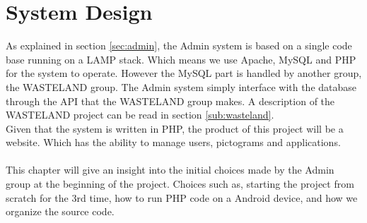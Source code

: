\chapter{System Design}
\label{chap:systemDesign}
As explained in section \vref{sec:admin}, the Admin system is based on a single code base running on a LAMP stack. Which means we use Apache, MySQL and PHP for the system to operate. However the MySQL part is handled by another group, the WASTELAND group. The Admin system simply interface with the database through the API that the WASTELAND group makes. A description of the WASTELAND project can be read in section \vref{sub:wasteland}.\\
Given that the system is written in PHP, the product of this project will be a website. Which has the ability to manage users, pictograms and applications.\\
\\
This chapter will give an insight into the initial choices made by the Admin group at the beginning of the project. Choices such as, starting the project from scratch for the 3rd time, how to run PHP code on a Android device, and how we organize the source code.


